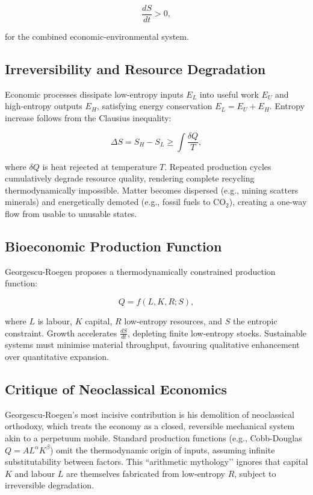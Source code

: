 \documentclass[12pt,a4paper]{article}
\begin{document}
\[
\frac{dS}{dt} > 0,
\]

for the combined economic-environmental system.

\subsection{Irreversibility and Resource Degradation}

Economic processes dissipate low-entropy inputs \(E_L\) into useful work \(E_U\) and high-entropy outputs \(E_H\), 
satisfying energy conservation \(E_L = E_U + E_H\). Entropy increase follows from the Clausius inequality:

\[
\Delta S = S_H - S_L \geq \int \frac{\delta Q}{T},
\]

where \(\delta Q\) is heat rejected at temperature \(T\). Repeated production cycles cumulatively degrade 
resource quality, rendering complete recycling thermodynamically impossible. 
Matter becomes dispersed (e.g., mining scatters minerals) and energetically demoted (e.g., fossil fuels to CO\(_2\)), 
creating a one-way flow from usable to unusable states.

\subsection{Bioeconomic Production Function}

Georgescu-Roegen proposes a thermodynamically constrained production function:

\[
Q = f(L, K, R; S),
\]

where \(L\) is labour, \(K\) capital, \(R\) low-entropy resources, and \(S\) the entropic constraint. 
Growth accelerates \(\frac{dS}{dt}\), depleting finite low-entropy stocks. 
Sustainable systems must minimise material throughput, 
favouring qualitative enhancement over quantitative expansion.

\subsection{Critique of Neoclassical Economics}

Georgescu-Roegen’s most incisive contribution is his demolition of neoclassical orthodoxy, 
which treats the economy as a closed, reversible mechanical system akin to a perpetuum mobile. 
Standard production functions (e.g., Cobb-Douglas \(Q = A L^\alpha K^\beta\)) 
omit the thermodynamic origin of inputs, assuming infinite substitutability between factors. 
This ``arithmetic mythology’’ ignores that capital \(K\) and labour \(L\) are themselves 
fabricated from low-entropy \(R\), subject to irreversible degradation.
\end{document}
